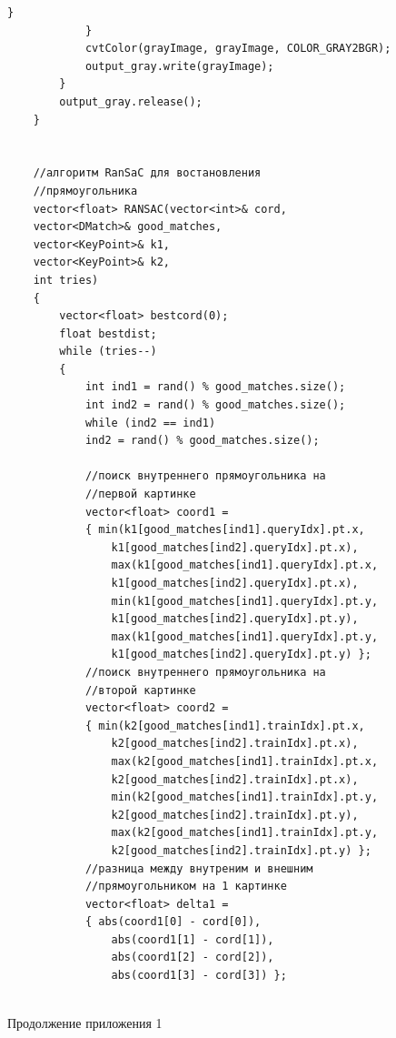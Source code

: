 \documentclass[14pt, a4paper]{extreport}
\begin{document}
\begin{Verbatim}[fontseries=c, fontsize=\fontsize{10pt}{12pt}\selectfont]
				}
			}
			cvtColor(grayImage, grayImage, COLOR_GRAY2BGR);
			output_gray.write(grayImage);
		}
		output_gray.release();
	}
	
	
	//алгоритм RanSaC для востановления
	//прямоугольника
	vector<float> RANSAC(vector<int>& cord,
	vector<DMatch>& good_matches,
	vector<KeyPoint>& k1,
	vector<KeyPoint>& k2,
	int tries)
	{
		vector<float> bestcord(0);
		float bestdist;
		while (tries--)
		{
			int ind1 = rand() % good_matches.size();
			int ind2 = rand() % good_matches.size();
			while (ind2 == ind1) 
			ind2 = rand() % good_matches.size();
			
			//поиск внутреннего прямоугольника на 
			//первой картинке
			vector<float> coord1 = 
			{ min(k1[good_matches[ind1].queryIdx].pt.x,
				k1[good_matches[ind2].queryIdx].pt.x),
				max(k1[good_matches[ind1].queryIdx].pt.x,
				k1[good_matches[ind2].queryIdx].pt.x),
				min(k1[good_matches[ind1].queryIdx].pt.y,
				k1[good_matches[ind2].queryIdx].pt.y),
				max(k1[good_matches[ind1].queryIdx].pt.y,
				k1[good_matches[ind2].queryIdx].pt.y) };
			//поиск внутреннего прямоугольника на 
			//второй картинке 
			vector<float> coord2 = 
			{ min(k2[good_matches[ind1].trainIdx].pt.x,
				k2[good_matches[ind2].trainIdx].pt.x),
				max(k2[good_matches[ind1].trainIdx].pt.x,
				k2[good_matches[ind2].trainIdx].pt.x),
				min(k2[good_matches[ind1].trainIdx].pt.y,
				k2[good_matches[ind2].trainIdx].pt.y),
				max(k2[good_matches[ind1].trainIdx].pt.y,
				k2[good_matches[ind2].trainIdx].pt.y) };
			//разница между внутреним и внешним 
			//прямоугольником на 1 картинке
			vector<float> delta1 = 
			{ abs(coord1[0] - cord[0]),
				abs(coord1[1] - cord[1]),
				abs(coord1[2] - cord[2]),
				abs(coord1[3] - cord[3]) };
			
\end{Verbatim}
\begin{flushright} \noindent Продолжение приложения 1 \end{flushright}
\end{document}
